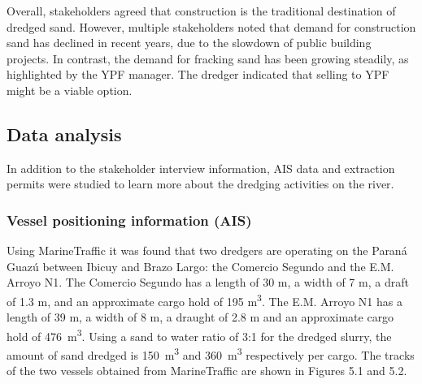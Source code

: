 Overall, stakeholders agreed that construction is the traditional destination of dredged sand. However, multiple stakeholders noted that demand for construction sand has declined in recent years, due to the slowdown of public building projects. In contrast, the demand for fracking sand has been growing steadily, as highlighted by the YPF manager. The dredger indicated that selling to YPF might be a viable option.

\subsection{Data analysis}
In addition to the stakeholder interview information, AIS data and extraction permits were studied to learn more about the dredging activities on the river. 
\subsubsection{Vessel positioning information (AIS)}
Using MarineTraffic it was found that two dredgers are operating on the Paraná Guazú between Ibicuy and Brazo Largo: the Comercio Segundo and the E.M. Arroyo N1. The Comercio Segundo has a length of 30 m, a width of 7 m, a draft of 1.3 m, and an approximate cargo hold of 195 m\textsuperscript{3}. The E.M. Arroyo N1 has a length of 39 m, a width of 8 m, a draught of 2.8 m and an approximate cargo hold of 476 \,m\textsuperscript{3}. Using a sand to water ratio of 3:1 for the dredged slurry, the amount of sand dredged is 150 \,m\textsuperscript{3} and 360 \,m\textsuperscript{3} respectively per cargo. The tracks of the two vessels obtained from MarineTraffic are shown in Figures 5.1 and 5.2.

